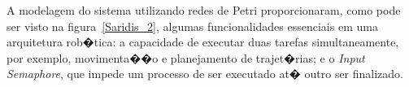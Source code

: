 A modelagem do sistema utilizando redes de Petri proporcionaram, como pode ser
visto na figura~\ref{Saridis_2}, algumas funcionalidades essenciais em uma
arquitetura rob�tica: a capacidade de executar duas tarefas simultaneamente, por
exemplo, movimenta��o e planejamento de trajet�rias; e o \emph{Input Semaphore},
que impede um processo de ser executado at� outro ser finalizado.
  
% 
% 
